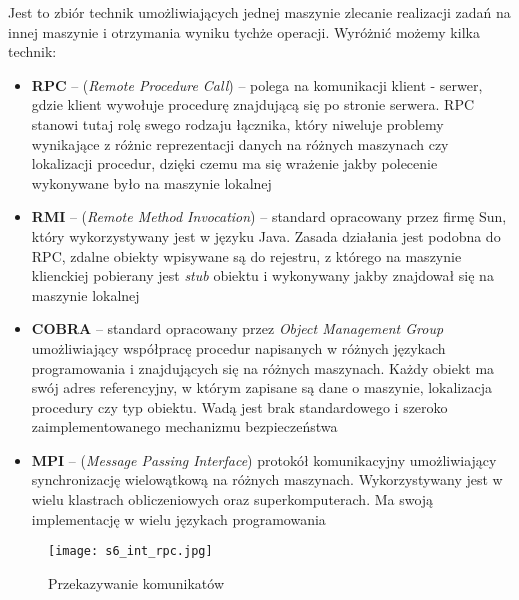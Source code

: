 Jest to zbiór technik umożliwiających jednej maszynie zlecanie realizacji zadań na innej maszynie i otrzymania wyniku tychże operacji. Wyróżnić możemy kilka technik:
\begin{itemize}
	\item \textbf{RPC} -- (\textit{Remote Procedure Call}) -- polega na komunikacji klient - serwer, gdzie klient wywołuje procedurę znajdującą się po stronie serwera. RPC stanowi tutaj rolę swego rodzaju łącznika, który niweluje problemy wynikające z różnic reprezentacji danych na różnych maszynach czy lokalizacji procedur, dzięki czemu ma się wrażenie jakby polecenie wykonywane było na maszynie lokalnej
    \item \textbf{RMI} -- (\textit{Remote Method Invocation}) -- standard opracowany przez firmę Sun, który wykorzystywany jest w języku Java. Zasada działania jest podobna do RPC, zdalne obiekty wpisywane są do rejestru, z którego na maszynie klienckiej pobierany jest \textit{stub} obiektu i wykonywany jakby znajdował się na maszynie lokalnej
    \item \textbf{COBRA} -- standard opracowany przez \textit{Object Management Group} umożliwiający współpracę procedur napisanych w różnych językach programowania i znajdujących się na różnych maszynach. Każdy obiekt ma swój adres referencyjny, w którym zapisane są dane o maszynie, lokalizacja procedury czy typ obiektu. Wadą jest brak standardowego i szeroko zaimplementowanego mechanizmu bezpieczeństwa
    \item \textbf{MPI} -- (\textit{Message Passing Interface}) protokół komunikacyjny umożliwiający synchronizację wielowątkową na różnych maszynach. Wykorzystywany jest w wielu klastrach obliczeniowych oraz superkomputerach. Ma swoją implementację w wielu językach programowania
\end{itemize}

\begin{figure}[!h]
\centering
\texttt{[image: s6\_int\_rpc.jpg]}
\caption{Przekazywanie komunikatów}
\end{figure}